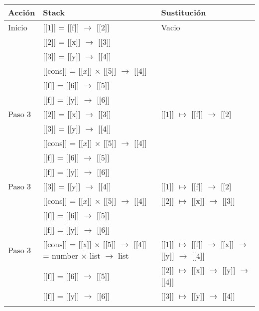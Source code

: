\documentclass[12pt]{article}
\begin{document}
    \begin{center}
      \begin{longtable}{ | l | p{10 cm} | p{5 cm} | }
        \hline
        Acción & Stack & Sustitución \\ \hline \hline
        Inicio & [[$\boxed{1}$]] = [[f]] $\rightarrow$ [[$\boxed{2}$]] & Vacio \\
        & [[$\boxed{2}$]] = [[x]] $\rightarrow$ [[$\boxed{3}$]] & \\
        & [[$\boxed{3}$]] = [[y]] $\rightarrow$ [[$\boxed{4}$]] & \\
        & [[cons]] = [[$\boxed{x}$]] $\times$ [[$\boxed{5}$]] $\rightarrow$ [[$\boxed{4}$]] & \\
        & [[f]] = [[$\boxed{6}$]] $\rightarrow$ [[$\boxed{5}$]] & \\
        & [[f]] = [[y]] $\rightarrow$ [[$\boxed{6}$]] & \\ \hline
        
        Paso 3 & [[$\boxed{2}$]] = [[x]] $\rightarrow$ [[$\boxed{3}$]] & [[$\boxed{1}$]] $\mapsto$ [[f]] $\rightarrow$ [[$\boxed{2}$] \\        
        & [[$\boxed{3}$]] = [[y]] $\rightarrow$ [[$\boxed{4}$]] & \\
        & [[cons]] = [[$\boxed{x}$]] $\times$ [[$\boxed{5}$]] $\rightarrow$ [[$\boxed{4}$]] & \\
        & [[f]] = [[$\boxed{6}$]] $\rightarrow$ [[$\boxed{5}$]] & \\
        & [[f]] = [[y]] $\rightarrow$ [[$\boxed{6}$]] & \\ \hline

        Paso 3 & [[$\boxed{3}$]] = [[y]] $\rightarrow$ [[$\boxed{4}$]] & [[$\boxed{1}$]] $\mapsto$ [[f]] $\rightarrow$ [[$\boxed{2}$] \\ 
        & [[cons]] = [[$\boxed{x}$]] $\times$ [[$\boxed{5}$]] $\rightarrow$ [[$\boxed{4}$]] &  [[$\boxed{2}$]] $\mapsto$ [[x]] $\rightarrow$ [[$\boxed{3}$]] \\
        & [[f]] = [[$\boxed{6}$]] $\rightarrow$ [[$\boxed{5}$]] & \\
        & [[f]] = [[y]] $\rightarrow$ [[$\boxed{6}$]] & \\ \hline
          
        Paso 3 & [[cons]] = [[x]] $\times$ [[$\boxed{5}$]] $\rightarrow$ [[$\boxed{4}$]]
        = number $\times$ list $\rightarrow$ list & [[$\boxed{1}$]] $\mapsto$ [[f]] $\rightarrow$ [[x]] $\rightarrow$ [[y]] $\rightarrow$ [[$\boxed{4}$]] \\
        & [[f]] = [[$\boxed{6}$]] $\rightarrow$ [[$\boxed{5}$]] & [[$\boxed{2}$]] $\mapsto$ [[x]] $\rightarrow$ [[y]] $\rightarrow$ [[$\boxed{4}$]] \\
        & [[f]] = [[y]] $\rightarrow$ [[$\boxed{6}$]] & [[$\boxed{3}$]] $\mapsto$ [[y]] $\rightarrow$ [[$\boxed{4}$]] \\
        &  & \\ \hline
        

\end{longtable}
\end{center}
\end{document}
